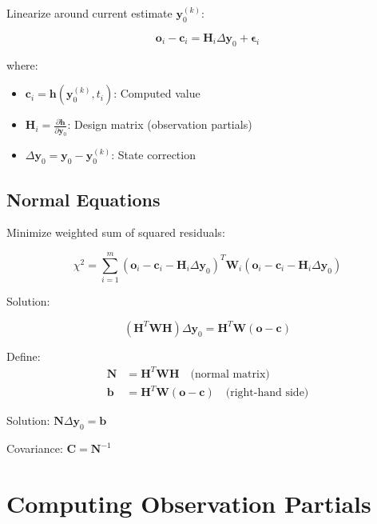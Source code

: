 Linearize around current estimate $\mathbf{y}_0^{(k)}$:

\begin{equation}
    \mathbf{o}_i - \mathbf{c}_i = \mathbf{H}_i \Delta\mathbf{y}_0 + \boldsymbol{\epsilon}_i
\end{equation}

where:
\begin{itemize}
    \item $\mathbf{c}_i = \mathbf{h}(\mathbf{y}_0^{(k)}, t_i)$: Computed value
    \item $\mathbf{H}_i = \frac{\partial \mathbf{h}}{\partial \mathbf{y}_0}$: Design matrix (observation partials)
    \item $\Delta\mathbf{y}_0 = \mathbf{y}_0 - \mathbf{y}_0^{(k)}$: State correction
\end{itemize}

\subsection{Normal Equations}

Minimize weighted sum of squared residuals:

\begin{equation}
    \chi^2 = \sum_{i=1}^m (\mathbf{o}_i - \mathbf{c}_i - \mathbf{H}_i \Delta\mathbf{y}_0)^T \mathbf{W}_i (\mathbf{o}_i - \mathbf{c}_i - \mathbf{H}_i \Delta\mathbf{y}_0)
\end{equation}

Solution:

\begin{equation}
    (\mathbf{H}^T \mathbf{W} \mathbf{H}) \Delta\mathbf{y}_0 = \mathbf{H}^T \mathbf{W} (\mathbf{o} - \mathbf{c})
\end{equation}

Define:
\begin{align}
    \mathbf{N} &= \mathbf{H}^T \mathbf{W} \mathbf{H} \quad \text{(normal matrix)} \\
    \mathbf{b} &= \mathbf{H}^T \mathbf{W} (\mathbf{o} - \mathbf{c}) \quad \text{(right-hand side)}
\end{align}

Solution: $\mathbf{N} \Delta\mathbf{y}_0 = \mathbf{b}$

Covariance: $\mathbf{C} = \mathbf{N}^{-1}$

\section{Computing Observation Partials}

